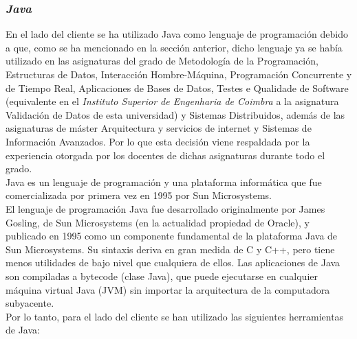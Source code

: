 \subsubsection{\textit{Java}} En el lado del cliente se ha utilizado Java como
lenguaje de programación debido a que, como se ha mencionado en la sección
anterior, dicho lenguaje ya se había utilizado en las asignaturas del grado de
Metodología de la Programación, Estructuras de Datos, Interacción
Hombre-Máquina, Programación Concurrente y de Tiempo Real, Aplicaciones de Bases
de Datos, Testes e Qualidade de Software (equivalente en el \textit{Instituto
Superior de Engenharia de Coimbra} a la asignatura Validación de Datos de esta
universidad) y Sistemas Distribuidos, además de las asignaturas de máster
Arquitectura y servicios de internet y Sistemas de Información Avanzados. Por lo
que esta decisión viene respaldada por la experiencia otorgada por los docentes
de dichas asignaturas durante todo el grado. \\
Java es un lenguaje de programación y una plataforma informática que fue
comercializada por primera vez en 1995 por Sun Microsystems.
\\
El lenguaje de programación Java fue desarrollado originalmente por James
Gosling, de Sun Microsystems (en la actualidad propiedad de Oracle), y
publicado en 1995 como un componente fundamental de la plataforma Java de Sun
Microsystems. Su sintaxis deriva en gran medida de C y C++, pero tiene menos
utilidades de bajo nivel que cualquiera de ellos. Las aplicaciones de Java son
compiladas a bytecode (clase Java), que puede ejecutarse en cualquier máquina
virtual Java (JVM) sin importar la arquitectura de la computadora subyacente.
\\
Por lo tanto, para el lado del cliente se han utilizado las siguientes herramientas de Java:

